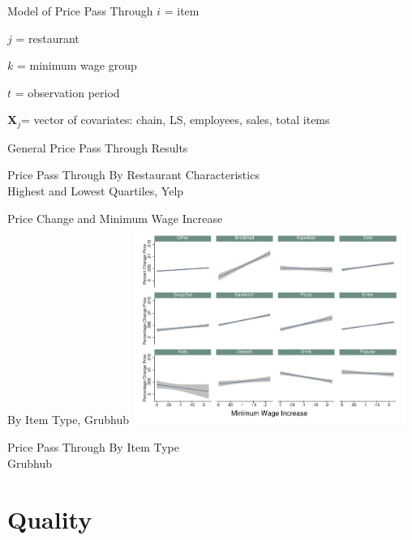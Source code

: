 \documentclass[xcolor=table]{beamer}
\begin{document}
\begin{spacing}{1.2}
\begin{frame} {Model of Price Pass Through}
$i$ = item

$j$ = restaurant

$k$ = minimum wage group

$t$ = observation period

$\boldsymbol{X}_j$= vector of covariates: chain, LS, employees, sales, total items

\end{frame}




\begin{frame}{General Price Pass Through Results}
\centering
\scriptsize

\end{frame}

\begin{frame}{Price Pass Through By Restaurant Characteristics \\ \large{Highest and Lowest Quartiles, Yelp}}
\centering
\tiny

\end{frame}


\begin{frame}{Price Change and Minimum Wage Increase \\\large{By Item Type, Grubhub}}
\centering
\includegraphics[width=3.5in]{grubhub_cats.pdf}
\end{frame}

\begin{frame}{Price Pass Through By Item Type \\ \small{Grubhub}}
\centering
\tiny

\end{frame}





\section{Quality}







\end{spacing}
\end{document}
